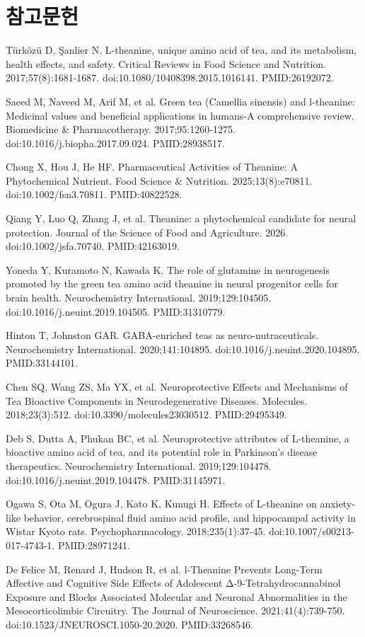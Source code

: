 \documentclass[11pt,oneside]{book}
\newcommand{\refstart}{\par\begingroup\footnotesize\setlength{\parskip}{2.5pt}\raggedright}
\newcommand{\reff}[2]{\par\hangindent=7mm\hangafter=1\noindent[#1]\hspace{2mm}#2\par}
\begin{document}
\section*{참고문헌}
\refstart
\reff{1}{Türközü D, Şanlier N. L-theanine, unique amino acid of tea, and its metabolism, health effects, and safety. Critical Reviews in Food Science and Nutrition. 2017;57(8):1681-1687. doi:10.1080/10408398.2015.1016141. PMID:26192072.}
\reff{2}{Saeed M, Naveed M, Arif M, et al. Green tea (Camellia sinensis) and l-theanine: Medicinal values and beneficial applications in humans-A comprehensive review. Biomedicine \& Pharmacotherapy. 2017;95:1260-1275. doi:10.1016/j.biopha.2017.09.024. PMID:28938517.}
\reff{3}{Chong X, Hou J, He HF. Pharmaceutical Activities of Theanine: A Phytochemical Nutrient. Food Science \& Nutrition. 2025;13(8):e70811. doi:10.1002/fsn3.70811. PMID:40822528.}
\reff{4}{Qiang Y, Luo Q, Zhang J, et al. Theanine: a phytochemical candidate for neural protection. Journal of the Science of Food and Agriculture. 2026. doi:10.1002/jsfa.70740. PMID:42163019.}
\reff{5}{Yoneda Y, Kuramoto N, Kawada K. The role of glutamine in neurogenesis promoted by the green tea amino acid theanine in neural progenitor cells for brain health. Neurochemistry International. 2019;129:104505. doi:10.1016/j.neuint.2019.104505. PMID:31310779.}
\reff{6}{Hinton T, Johnston GAR. GABA-enriched teas as neuro-nutraceuticals. Neurochemistry International. 2020;141:104895. doi:10.1016/j.neuint.2020.104895. PMID:33144101.}
\reff{7}{Chen SQ, Wang ZS, Ma YX, et al. Neuroprotective Effects and Mechanisms of Tea Bioactive Components in Neurodegenerative Diseases. Molecules. 2018;23(3):512. doi:10.3390/molecules23030512. PMID:29495349.}
\reff{8}{Deb S, Dutta A, Phukan BC, et al. Neuroprotective attributes of L-theanine, a bioactive amino acid of tea, and its potential role in Parkinson's disease therapeutics. Neurochemistry International. 2019;129:104478. doi:10.1016/j.neuint.2019.104478. PMID:31145971.}
\reff{9}{Ogawa S, Ota M, Ogura J, Kato K, Kunugi H. Effects of L-theanine on anxiety-like behavior, cerebrospinal fluid amino acid profile, and hippocampal activity in Wistar Kyoto rats. Psychopharmacology. 2018;235(1):37-45. doi:10.1007/s00213-017-4743-1. PMID:28971241.}
\reff{10}{De Felice M, Renard J, Hudson R, et al. l-Theanine Prevents Long-Term Affective and Cognitive Side Effects of Adolescent Δ-9-Tetrahydrocannabinol Exposure and Blocks Associated Molecular and Neuronal Abnormalities in the Mesocorticolimbic Circuitry. The Journal of Neuroscience. 2021;41(4):739-750. doi:10.1523/JNEUROSCI.1050-20.2020. PMID:33268546.}
\end{document}
